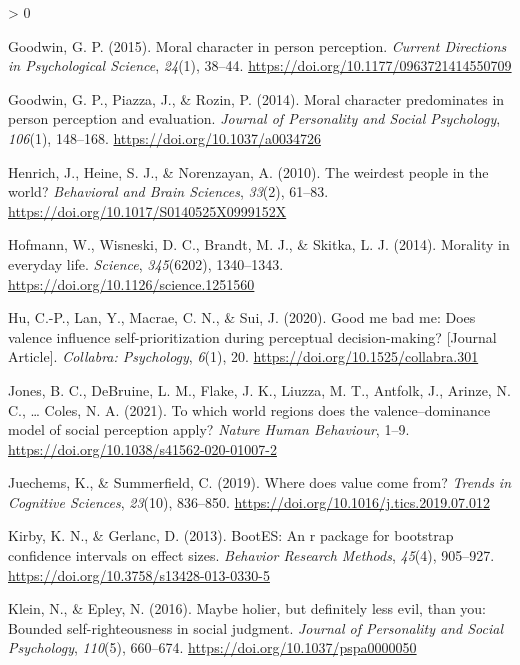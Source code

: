 \documentclass[
  english,
  man]{apa6}
\newlength{\cslhangindent}
\newenvironment{CSLReferences}[2] %
 {%
  \setlength{\parindent}{0pt}
  \ifodd #1 \everypar{\setlength{\hangindent}{\cslhangindent}}\ignorespaces\fi
  \ifnum #2 > 0
  \setlength{\parskip}{#2\baselineskip}
  \fi
 }%
 {}
\begin{document}
\begin{CSLReferences}{1}{0}
\leavevmode\hypertarget{ref-goodwin_moral_2015}{}%
Goodwin, G. P. (2015). Moral character in person perception. \emph{Current Directions in Psychological Science}, \emph{24}(1), 38--44. \url{https://doi.org/10.1177/0963721414550709}

\leavevmode\hypertarget{ref-goodwin_moral_2014}{}%
Goodwin, G. P., Piazza, J., \& Rozin, P. (2014). Moral character predominates in person perception and evaluation. \emph{Journal of Personality and Social Psychology}, \emph{106}(1), 148--168. \url{https://doi.org/10.1037/a0034726}

\leavevmode\hypertarget{ref-henrich_weirdest_2010}{}%
Henrich, J., Heine, S. J., \& Norenzayan, A. (2010). The weirdest people in the world? \emph{Behavioral and Brain Sciences}, \emph{33}(2), 61--83. \url{https://doi.org/10.1017/S0140525X0999152X}

\leavevmode\hypertarget{ref-hofmann_morality_2014}{}%
Hofmann, W., Wisneski, D. C., Brandt, M. J., \& Skitka, L. J. (2014). Morality in everyday life. \emph{Science}, \emph{345}(6202), 1340--1343. \url{https://doi.org/10.1126/science.1251560}

\leavevmode\hypertarget{ref-Hu_2020_GoodSelf}{}%
Hu, C.-P., Lan, Y., Macrae, C. N., \& Sui, J. (2020). Good me bad me: Does valence influence self-prioritization during perceptual decision-making? {[}Journal Article{]}. \emph{Collabra: Psychology}, \emph{6}(1), 20. \url{https://doi.org/10.1525/collabra.301}

\leavevmode\hypertarget{ref-jones_which_2021}{}%
Jones, B. C., DeBruine, L. M., Flake, J. K., Liuzza, M. T., Antfolk, J., Arinze, N. C., \ldots{} Coles, N. A. (2021). To which world regions does the valence--dominance model of social perception apply? \emph{Nature Human Behaviour}, 1--9. \url{https://doi.org/10.1038/s41562-020-01007-2}

\leavevmode\hypertarget{ref-juechems_where_2019}{}%
Juechems, K., \& Summerfield, C. (2019). Where does value come from? \emph{Trends in Cognitive Sciences}, \emph{23}(10), 836--850. \url{https://doi.org/10.1016/j.tics.2019.07.012}

\leavevmode\hypertarget{ref-kirby_bootes_2013}{}%
Kirby, K. N., \& Gerlanc, D. (2013). {BootES}: An r package for bootstrap confidence intervals on effect sizes. \emph{Behavior Research Methods}, \emph{45}(4), 905--927. \url{https://doi.org/10.3758/s13428-013-0330-5}

\leavevmode\hypertarget{ref-klein_maybe_2016}{}%
Klein, N., \& Epley, N. (2016). Maybe holier, but definitely less evil, than you: Bounded self-righteousness in social judgment. \emph{Journal of Personality and Social Psychology}, \emph{110}(5), 660--674. \url{https://doi.org/10.1037/pspa0000050}


\end{CSLReferences}
\end{document}
